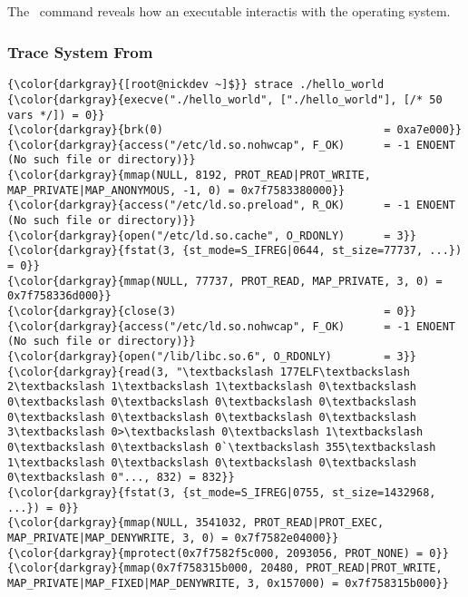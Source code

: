 % 

\subsection{\strace}
\label{sec:strace}
The \strace \ command reveals how an executable interactis with the operating system.

		\subsubsection{Trace System From \href{https://web.archive.org/web/20230101034530/https://aws-labs.com/strace-lsof-track-process-hangs/}{}}
{\footnotesize{
\begin{Verbatim}[commandchars=\\\{\}]
{\color{darkgray}{[root@nickdev ~]$}} strace ./hello_world 
{\color{darkgray}{execve("./hello_world", ["./hello_world"], [/* 50 vars */]) = 0}}
{\color{darkgray}{brk(0)                                  = 0xa7e000}}
{\color{darkgray}{access("/etc/ld.so.nohwcap", F_OK)      = -1 ENOENT (No such file or directory)}}
{\color{darkgray}{mmap(NULL, 8192, PROT_READ|PROT_WRITE, MAP_PRIVATE|MAP_ANONYMOUS, -1, 0) = 0x7f7583380000}}
{\color{darkgray}{access("/etc/ld.so.preload", R_OK)      = -1 ENOENT (No such file or directory)}}
{\color{darkgray}{open("/etc/ld.so.cache", O_RDONLY)      = 3}}
{\color{darkgray}{fstat(3, {st_mode=S_IFREG|0644, st_size=77737, ...}) = 0}}
{\color{darkgray}{mmap(NULL, 77737, PROT_READ, MAP_PRIVATE, 3, 0) = 0x7f758336d000}}
{\color{darkgray}{close(3)                                = 0}}
{\color{darkgray}{access("/etc/ld.so.nohwcap", F_OK)      = -1 ENOENT (No such file or directory)}}
{\color{darkgray}{open("/lib/libc.so.6", O_RDONLY)        = 3}}
{\color{darkgray}{read(3, "\textbackslash 177ELF\textbackslash 2\textbackslash 1\textbackslash 1\textbackslash 0\textbackslash 0\textbackslash 0\textbackslash 0\textbackslash 0\textbackslash 0\textbackslash 0\textbackslash 0\textbackslash 0\textbackslash 3\textbackslash 0>\textbackslash 0\textbackslash 1\textbackslash 0\textbackslash 0\textbackslash 0`\textbackslash 355\textbackslash 1\textbackslash 0\textbackslash 0\textbackslash 0\textbackslash 0\textbackslash 0"..., 832) = 832}}
{\color{darkgray}{fstat(3, {st_mode=S_IFREG|0755, st_size=1432968, ...}) = 0}}
{\color{darkgray}{mmap(NULL, 3541032, PROT_READ|PROT_EXEC, MAP_PRIVATE|MAP_DENYWRITE, 3, 0) = 0x7f7582e04000}}
{\color{darkgray}{mprotect(0x7f7582f5c000, 2093056, PROT_NONE) = 0}}
{\color{darkgray}{mmap(0x7f758315b000, 20480, PROT_READ|PROT_WRITE, MAP_PRIVATE|MAP_FIXED|MAP_DENYWRITE, 3, 0x157000) = 0x7f758315b000}}

\end{Verbatim}}}
